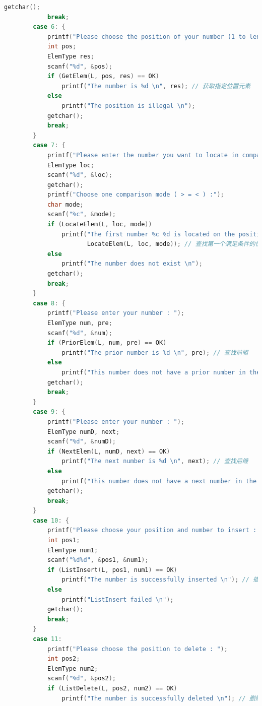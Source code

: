\documentclass[supercite]{Experimental_Report}
\theoremstyle{definition}
\begin{document}
\begin{lstlisting}[language=c]
            getchar();
            break;
        case 6: {
            printf("Please choose the position of your number (1 to length) : ");
            int pos;
            ElemType res;
            scanf("%d", &pos);
            if (GetElem(L, pos, res) == OK)
                printf("The number is %d \n", res); // 获取指定位置元素
            else
                printf("The position is illegal \n");
            getchar();
            break;
        }
        case 7: {
            printf("Please enter the number you want to locate in comparison : ");
            ElemType loc;
            scanf("%d", &loc);
            getchar();
            printf("Choose one comparison mode ( > = < ) :");
            char mode;
            scanf("%c", &mode);
            if (LocateElem(L, loc, mode))
                printf("The first number %c %d is located on the position of %d \n", mode, loc,
                       LocateElem(L, loc, mode)); // 查找第一个满足条件的位置
            else
                printf("The number does not exist \n");
            getchar();
            break;
        }
        case 8: {
            printf("Please enter your number : ");
            ElemType num, pre;
            scanf("%d", &num);
            if (PriorElem(L, num, pre) == OK)
                printf("The prior number is %d \n", pre); // 查找前驱
            else
                printf("This number does not have a prior number in the list \n");
            getchar();
            break;
        }
        case 9: {
            printf("Please enter your number : ");
            ElemType numD, next;
            scanf("%d", &numD);
            if (NextElem(L, numD, next) == OK)
                printf("The next number is %d \n", next); // 查找后继
            else
                printf("This number does not have a next number in the list \n");
            getchar();
            break;
        }
        case 10: {
            printf("Please choose your position and number to insert : ");
            int pos1;
            ElemType num1;
            scanf("%d%d", &pos1, &num1);
            if (ListInsert(L, pos1, num1) == OK)
                printf("The number is successfully inserted \n"); // 插入元素
            else
                printf("ListInsert failed \n");
            getchar();
            break;
        }
        case 11:
            printf("Please choose the position to delete : ");
            int pos2;
            ElemType num2;
            scanf("%d", &pos2);
            if (ListDelete(L, pos2, num2) == OK)
                printf("The number is successfully deleted \n"); // 删除元素

\end{lstlisting}
\end{document}

